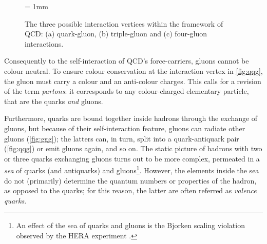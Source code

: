 \begin{figure}[H]
\begin{center}
\unitlength = 1mm
\end{center}
\caption{The three possible interaction vertices within the framework of QCD: (a) quark-gluon, (b) triple-gluon and (c) four-gluon interactions.}
\label{fig:FeynmanDiagQCD}
\end{figure}

Consequently to the self-interaction of QCD's force-carriers, gluons cannot be colour neutral. To ensure colour conservation at the interaction vertex in \fig\ref{fig:qqg}, the gluon must carry a colour and an anti-colour charges. This calls for a revision of the term \textit{partons}: it corresponds to any colour-charged elementary particle, that are the quarks \textit{and} gluons.

Furthermore, quarks are bound together inside hadrons through the exchange of gluons, but because of their self-interaction feature, gluons can radiate other gluons (\fig\ref{fig:ggg}); the latters can, in turn, split into a quark-antiquark pair (\fig\ref{fig:qqg}) or emit gluons again, and so on. The static picture of hadrons  with two or three quarks exchanging gluons turns out to be more complex, permeated in a \textit{sea} of quarks (and antiquarks) and gluons\footnote{An effect of the sea of quarks and gluons is the Bjorken scaling violation observed by the HERA experiment \cite{braibantParticlesFundamentalInteractions2012, thomsonModernParticlePhysics2013}.}. However, the elements inside the sea do not (primarily) determine the quantum numbers or properties of the hadron, as opposed to the  quarks; for this reason, the latter are often referred as \textit{valence quarks}.

